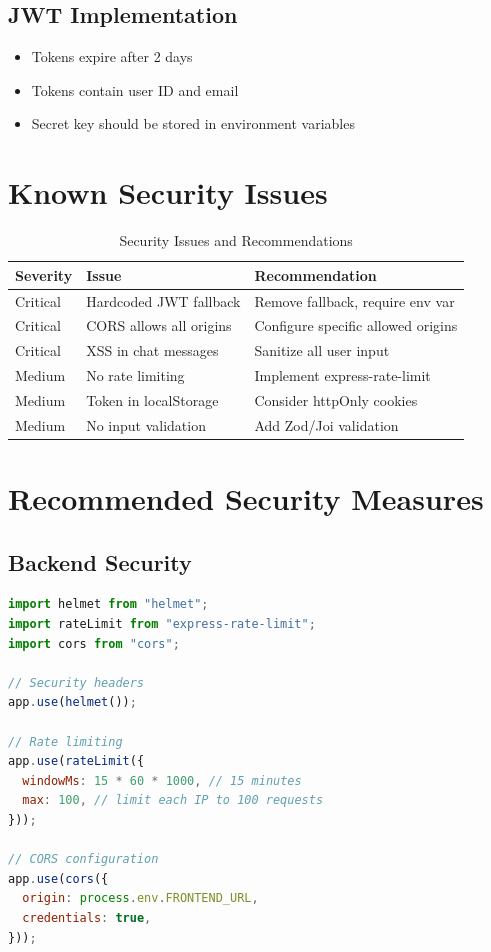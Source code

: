 \documentclass[12pt,a4paper]{report}
\begin{document}
\subsection{JWT Implementation}

\begin{itemize}
    \item Tokens expire after 2 days
    \item Tokens contain user ID and email
    \item Secret key should be stored in environment variables
\end{itemize}

\section{Known Security Issues}

\begin{table}[H]
\centering
\begin{tabularx}{\textwidth}{|l|l|X|}
\hline
\textbf{Severity} & \textbf{Issue} & \textbf{Recommendation} \\
\hline
\textcolor{danger}{Critical} & Hardcoded JWT fallback & Remove fallback, require env var \\
\hline
\textcolor{danger}{Critical} & CORS allows all origins & Configure specific allowed origins \\
\hline
\textcolor{danger}{Critical} & XSS in chat messages & Sanitize all user input \\
\hline
\textcolor{accent}{Medium} & No rate limiting & Implement express-rate-limit \\
\hline
\textcolor{accent}{Medium} & Token in localStorage & Consider httpOnly cookies \\
\hline
\textcolor{accent}{Medium} & No input validation & Add Zod/Joi validation \\
\hline
\end{tabularx}
\caption{Security Issues and Recommendations}
\end{table}

\section{Recommended Security Measures}

\subsection{Backend Security}

\begin{lstlisting}[language=JavaScript, caption=Recommended Security Middleware]
import helmet from "helmet";
import rateLimit from "express-rate-limit";
import cors from "cors";

// Security headers
app.use(helmet());

// Rate limiting
app.use(rateLimit({
  windowMs: 15 * 60 * 1000, // 15 minutes
  max: 100, // limit each IP to 100 requests
}));

// CORS configuration
app.use(cors({
  origin: process.env.FRONTEND_URL,
  credentials: true,
}));
\end{lstlisting}
\end{document}
